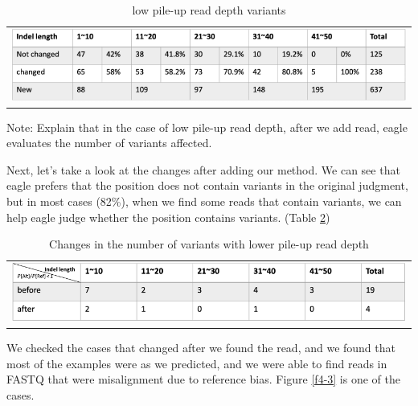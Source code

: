 \vspace{1cm}
\begin{table}[h]
    \centering
    \caption[low pile-up read depth variants]{low pile-up read depth variants}
    \vspace{-0.5cm}
    \begin{tabular}{c}
        \includegraphics[width=1\textwidth]{body/image/t4-2.png}
    \end{tabular}
    \label{t4-2}
    {Note: Explain that in the case of low pile-up read depth, after we add read, eagle evaluates the number of variants affected.}
\end{table}

Next, let’s take a look at the changes after adding our method. We can see that eagle prefers that the position does not contain variants in the original judgment, but in most cases (82\%), when we find some reads that contain variants, we can help eagle judge whether the position contains variants. (Table \ref{t4-3})

\vspace{1cm}
\begin{center}
\begin{table}[h]
    \centering
    \caption[Changes in the number of variants with lower pile-up read depth]{Changes in the number of variants with lower pile-up read depth}
    \vspace{-0.5cm}
    \begin{tabular}{c}
        \includegraphics[width=1\textwidth]{body/image/t4-3.png}
    \end{tabular}
    \label{t4-3}
\end{table}
\end{center}

We checked the cases that changed after we found the read, and we found that most of the examples were as we predicted, and we were able to find reads in FASTQ that were misalignment due to reference bias. Figure \ref{f4-3} is one of the cases.

